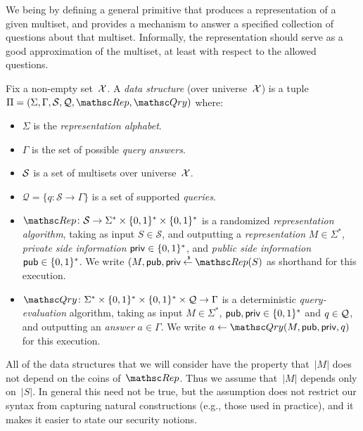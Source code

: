   We being by defining a general primitive
that produces a representation of a given multiset, and provides a
mechanism to answer a specified collection of questions about that
multiset.  Informally, the representation should serve as a good
approximation of the multiset, at least with respect to the allowed
questions.
\begin{definition} \rm
Fix a non-empty set~${\cal X}$. A \emph{data structure} (over universe~${\cal X}$)
is a tuple $\setprim=(\Sigma,\Gamma,\calS,\calQ,\Rep, \Qry)$ where:
\begin{itemize}
\item $\Sigma$ is the \emph{representation alphabet}.
\item $\Gamma$ is the set of possible \emph{query answers}.
\item ${\cal S}$ is a set  of multisets over universe~${\cal X}$.
\item $\mathcal{Q}=\{q \colon \mathcal{S} \to \Gamma\}$ is a set
    of supported \emph{queries}.
\item $\Rep \colon \mathcal{S} \to \Sigma^* \times \bits^*
    \times \bits^*$ is a randomized \emph{representation
    algorithm}, taking as input $S \in \mathcal{S}$, and
    outputting a \emph{representation} $M \in \Sigma^*$,
    \emph{private side information} ${\sf priv} \in \{0,1\}^*$, and
    \emph{public side information} ${\sf pub} \in \{0,1\}^*$.  We write
    $(M,\pubaux,\privaux \getsr \Rep(S)$ as shorthand for this execution.
\item $\Qry\colon \Sigma^* \times \bits^* \times \bits^* \times \calQ \to
    \Gamma$ is a deterministic \emph{query-evaluation}
    algorithm, taking as input $M\in\Sigma^*$, ${\sf pub},{\sf priv} \in
    \{0,1\}^*$ and $q \in {\cal Q}$, and outputting
    an \emph{answer} $a \in \Gamma$.  We write $a \gets
    \Qry(M,\pubaux,\privaux,q)$ for this execution.
\end{itemize}
\hfill\dqed
\end{definition}
All of the data structures that
we will consider have the property that~$|M|$ does not depend on the
coins of~$\Rep$. Thus we assume that~$|M|$ depends only on~$|S|$. In
general this need not be true, but the assumption does not restrict
our syntax from capturing natural constructions (e.g., those used in
practice), and it makes it easier to state our security notions.


